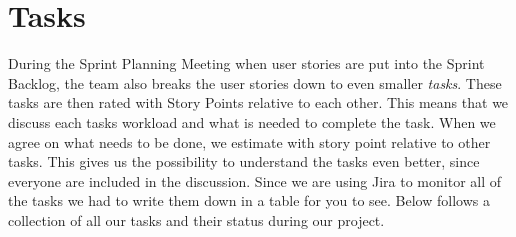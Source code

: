 \section{Tasks}
During the Sprint Planning Meeting when user stories are put into the Sprint Backlog, the team also breaks the user stories down to even smaller \textit{tasks}. These tasks are then rated with Story Points relative to each other. This means that we discuss each tasks workload and what is needed to complete the task. When we agree on what needs to be done, we estimate with story point relative to other tasks. This gives us the possibility to understand the tasks even better, since everyone are included in the discussion. Since we are using Jira to monitor all of the tasks we had to write them down in a table for you to see. Below follows a collection of all our tasks and their status during our project. 

\vspace*{1cm}


